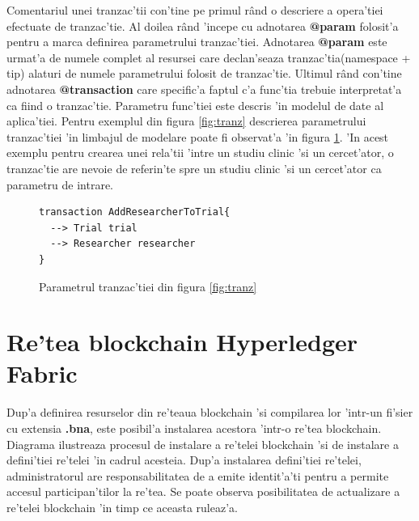 \documentclass[12pt,a4paper,twoside]{report}
\begin{document}
Comentariul unei tranzac'tii con'tine pe primul r\^and o descriere a opera'tiei efectuate de tranzac'tie. Al doilea r\^and 'incepe cu adnotarea \textbf{@param} folosit'a pentru a marca definirea parametrului tranzac'tiei. Adnotarea  \textbf{@param} este urmat'a de numele complet al resursei care declan'seaza tranzac'tia(namespace + tip) alaturi de numele parametrului folosit de tranzac'tie. Ultimul r\^and con'tine adnotarea  \textbf{@transaction} care specific'a faptul c'a func'tia trebuie interpretat'a ca fiind o tranzac'tie.
Parametru func'tiei este descris 'in modelul de date al aplica'tiei. Pentru exemplul din figura \ref{fig:tranz} descrierea parametrului tranzac'tiei 'in limbajul de modelare poate fi observat'a 'in figura \ref{fig:par}. 'In acest exemplu pentru crearea unei rela'tii 'intre un studiu clinic 'si un cercet'ator, o tranzac'tie are nevoie de referin'te spre un studiu clinic 'si un cercet'ator ca parametru de intrare.

    	\begin{figure}[H]
		\begin{center}
		\begin{lstlisting}[style=htmlcssjs]
transaction AddResearcherToTrial{
  --> Trial trial
  --> Researcher researcher
}
		\end{lstlisting}
			\caption{Parametrul tranzac'tiei din figura \ref{fig:tranz}}
  			\label{fig:par}
  		\end{center}
  		\end{figure}

\section{Re'tea blockchain Hyperledger Fabric}
    Dup'a definirea resurselor din re'teaua blockchain 'si compilarea lor 'intr-un fi'sier cu extensia \textbf{.bna}, este posibil'a instalarea acestora 'intr-o re'tea blockchain. Diagrama ilustreaza procesul de instalare a re'telei blockchain 'si de instalare a defini'tiei re'telei 'in cadrul acesteia. Dup'a instalarea defini'tiei re'telei, administratorul are responsabilitatea de a emite identit'a'ti pentru a permite accesul participan'tilor la re'tea. Se poate observa posibilitatea de actualizare a re'telei blockchain 'in timp ce aceasta ruleaz'a.
    
\end{document}

